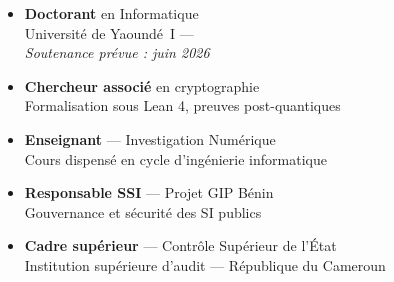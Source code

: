 \begin{minipage}[t]{0.52\textwidth}
\begin{tcolorbox}[
    enhanced,
    colback=CouleurDef,
    colframe=CouleurBordDef,
    fonttitle=\bfseries\color{white},
    title={\textbf{[\S]}\quad Parcours Académique et Institutionnel},
    attach boxed title to top left={yshift=-2mm, xshift=4mm},
    boxed title style={colback=CouleurBordDef, rounded corners},
    arc=3pt, boxrule=0.8pt,
    left=6pt, right=6pt, top=8pt, bottom=6pt
]
\begin{itemize}
    \item \textbf{Doctorant} en Informatique\\
          {\footnotesize Université de Yaoundé~I — \\
          \textit{Soutenance prévue : juin 2026}}
    \item \textbf{Chercheur associé} en cryptographie\\
          {\footnotesize Formalisation sous Lean 4, preuves post-quantiques}
    \item \textbf{Enseignant} --- Investigation Numérique\\
          {\footnotesize Cours dispensé en cycle d'ingénierie informatique}
    \item \textbf{Responsable SSI} --- Projet GIP Bénin\\
          {\footnotesize Gouvernance et sécurité des SI publics}
    \item \textbf{Cadre supérieur} --- Contrôle Supérieur de l'État\\
          {\footnotesize Institution supérieure d'audit — République du Cameroun}
\end{itemize}
\end{tcolorbox}
\end{minipage}
\hfill
